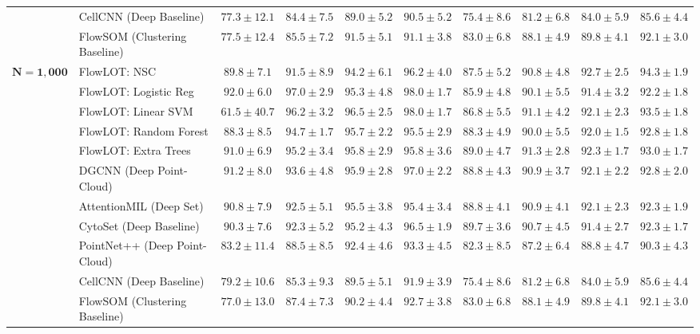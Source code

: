 \documentclass[10pt,journal,compsoc]{IEEEtran}
\begin{document}
\begin{table}[t]
\begin{tabular}{ll cccc cccc}
 & CellCNN (Deep Baseline) & $77.3 \pm 12.1$ & $84.4 \pm 7.5$ & $89.0 \pm 5.2$ & $90.5 \pm 5.2$ & $75.4 \pm 8.6$ & $81.2 \pm 6.8$ & $84.0 \pm 5.9$ & $85.6 \pm 4.4$ \\
 & FlowSOM (Clustering Baseline) & $77.5 \pm 12.4$ & $85.5 \pm 7.2$ & $91.5 \pm 5.1$ & $91.1 \pm 3.8$ & $83.0 \pm 6.8$ & $88.1 \pm 4.9$ & $89.8 \pm 4.1$ & $92.1 \pm 3.0$ \\
\midrule
\multirow{11}{*}{$\mathbf{N = 1,000}$} & FlowLOT: NSC & $89.8 \pm 7.1$ & $91.5 \pm 8.9$ & $94.2 \pm 6.1$ & $96.2 \pm 4.0$ & $87.5 \pm 5.2$ & $90.8 \pm 4.8$ & $92.7 \pm 2.5$ & $94.3 \pm 1.9$ \\
 & FlowLOT: Logistic Reg & $92.0 \pm 6.0$ & $97.0 \pm 2.9$ & $95.3 \pm 4.8$ & $98.0 \pm 1.7$ & $85.9 \pm 4.8$ & $90.1 \pm 5.5$ & $91.4 \pm 3.2$ & $92.2 \pm 1.8$ \\
 & FlowLOT: Linear SVM & $61.5 \pm 40.7$ & $96.2 \pm 3.2$ & $96.5 \pm 2.5$ & $98.0 \pm 1.7$ & $86.8 \pm 5.5$ & $91.1 \pm 4.2$ & $92.1 \pm 2.3$ & $93.5 \pm 1.8$ \\
 & FlowLOT: Random Forest & $88.3 \pm 8.5$ & $94.7 \pm 1.7$ & $95.7 \pm 2.2$ & $95.5 \pm 2.9$ & $88.3 \pm 4.9$ & $90.0 \pm 5.5$ & $92.0 \pm 1.5$ & $92.8 \pm 1.8$ \\
 & FlowLOT: Extra Trees & $91.0 \pm 6.9$ & $95.2 \pm 3.4$ & $95.8 \pm 2.9$ & $95.8 \pm 3.6$ & $89.0 \pm 4.7$ & $91.3 \pm 2.8$ & $92.3 \pm 1.7$ & $93.0 \pm 1.7$ \\
 & DGCNN (Deep Point-Cloud) & $91.2 \pm 8.0$ & $93.6 \pm 4.8$ & $95.9 \pm 2.8$ & $97.0 \pm 2.2$ & $88.8 \pm 4.3$ & $90.9 \pm 3.7$ & $92.1 \pm 2.2$ & $92.8 \pm 2.0$ \\
 & AttentionMIL (Deep Set) & $90.8 \pm 7.9$ & $92.5 \pm 5.1$ & $95.5 \pm 3.8$ & $95.4 \pm 3.4$ & $88.8 \pm 4.1$ & $90.9 \pm 4.1$ & $92.1 \pm 2.3$ & $92.3 \pm 1.9$ \\
 & CytoSet (Deep Baseline) & $90.3 \pm 7.6$ & $92.3 \pm 5.2$ & $95.2 \pm 4.3$ & $96.5 \pm 1.9$ & $89.7 \pm 3.6$ & $90.7 \pm 4.5$ & $91.4 \pm 2.7$ & $92.3 \pm 1.7$ \\
 & PointNet++ (Deep Point-Cloud) & $83.2 \pm 11.4$ & $88.5 \pm 8.5$ & $92.4 \pm 4.6$ & $93.3 \pm 4.5$ & $82.3 \pm 8.5$ & $87.2 \pm 6.4$ & $88.8 \pm 4.7$ & $90.3 \pm 4.3$ \\
 & CellCNN (Deep Baseline) & $79.2 \pm 10.6$ & $85.3 \pm 9.3$ & $89.5 \pm 5.1$ & $91.9 \pm 3.9$ & $75.4 \pm 8.6$ & $81.2 \pm 6.8$ & $84.0 \pm 5.9$ & $85.6 \pm 4.4$ \\
 & FlowSOM (Clustering Baseline) & $77.0 \pm 13.0$ & $87.4 \pm 7.3$ & $90.2 \pm 4.4$ & $92.7 \pm 3.8$ & $83.0 \pm 6.8$ & $88.1 \pm 4.9$ & $89.8 \pm 4.1$ & $92.1 \pm 3.0$ \\

\end{tabular}
\end{table}
\end{document}
